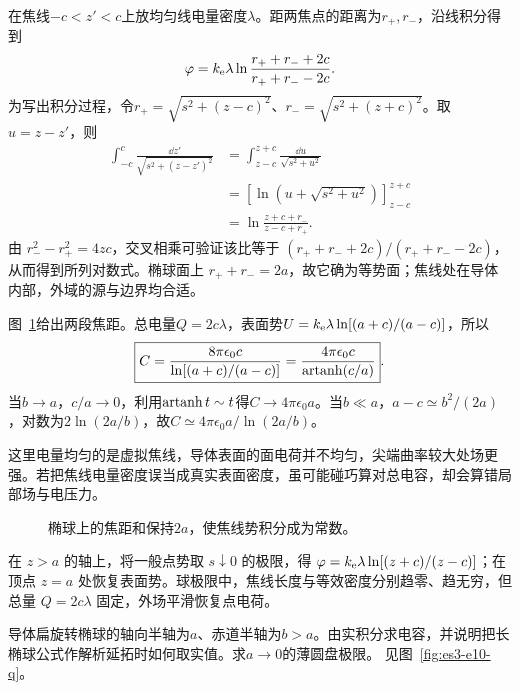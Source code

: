 \begin{solution}
在焦线$-c<z'<c$上放均匀线电量密度$\lambda$。距两焦点的距离为$r_+,r_-$，沿线积分得到
\[\varphi=k_{\rm e}\lambda\ln\frac{r_++r_-+2c}{r_++r_--2c}.
\]
为写出积分过程，令$r_+=\sqrt{s^2+(z-c)^2}$、$r_-=\sqrt{s^2+(z+c)^2}$。取$u=z-z'$，则
\[\begin{split}
\int_{-c}^c\frac{\dd z'}{\sqrt{s^2+(z-z')^2}}
&=\int_{z-c}^{z+c}\frac{\dd u}{\sqrt{s^2+u^2}}\\
&=\left[\ln\left(u+\sqrt{s^2+u^2}\right)\right]_{z-c}^{z+c}\\
&=\ln\frac{z+c+r_-}{z-c+r_+}.
\end{split}\]
由 $r_-^2-r_+^2=4zc$，交叉相乘可验证该比等于 $(r_++r_-+2c)/(r_++r_--2c)$，从而得到所列对数式。椭球面上 $r_++r_-=2a$，故它确为等势面；焦线处在导体内部，外域的源与边界均合适。

图~\ref{fig:es3-e9-s}给出两段焦距。总电量$Q=2c\lambda$，表面势$U=k_{\rm e}\lambda\ln[(a+c)/(a-c)]$，所以
\[\boxed{C=\frac{8\pi\epsilon_0c}{\ln[(a+c)/(a-c)]}
=\frac{4\pi\epsilon_0c}{\operatorname{artanh}(c/a)}}.
\]
当$b\to a$，$c/a\to0$，利用$\operatorname{artanh} t\sim t$得$C\to4\pi\epsilon_0a$。当$b\ll a$，$a-c\simeq b^2/(2a)$，对数为$2\ln(2a/b)$，故$C\simeq4\pi\epsilon_0a/\ln(2a/b)$。

这里电量均匀的是虚拟焦线，导体表面的面电荷并不均匀，尖端曲率较大处场更强。若把焦线电量密度误当成真实表面密度，虽可能碰巧算对总电容，却会算错局部场与电压力。
\begin{figure}[H]\centering
{}
\caption{椭球上的焦距和保持$2a$，使焦线势积分成为常数。}\label{fig:es3-e9-s}
\end{figure}


在 $z>a$ 的轴上，将一般点势取 $s\downarrow0$ 的极限，得 $\varphi=k_{\rm e}\lambda\ln[(z+c)/(z-c)]$；在顶点 $z=a$ 处恢复表面势。球极限中，焦线长度与等效密度分别趋零、趋无穷，但总量 $Q=2c\lambda$ 固定，外场平滑恢复点电荷。
\end{solution}

\begin{example}[扁旋转椭球与薄圆盘]\label{ex:es3-e10}
导体扁旋转椭球的轴向半轴为$a$、赤道半轴为$b>a$。由实积分求电容，并说明把长椭球公式作解析延拓时如何取实值。求$a\to0$的薄圆盘极限。 见图~\ref{fig:es3-e10-q}。
\end{example}

